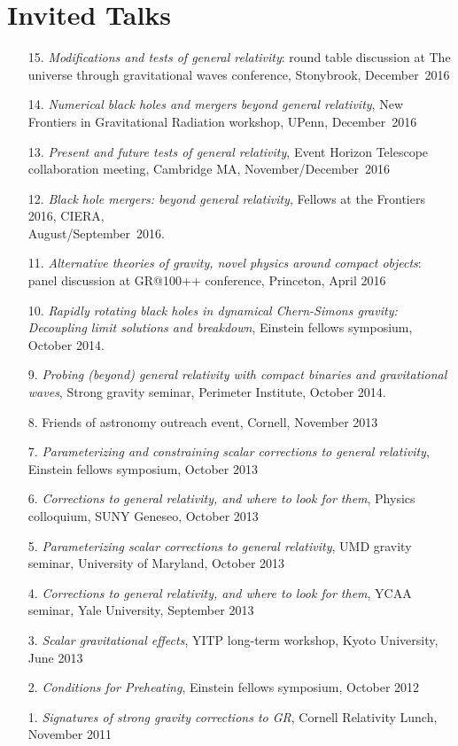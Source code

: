 \newcommand{\playsymbol}{$\blacktriangleright$}
\section{\sc Invited Talks}
\begin{enumerate}
\item[{15.}] {\it Modifications and tests of general relativity}:
  round table discussion at
  The universe through gravitational waves conference,
  Stonybrook, December~2016
\item[{14.}] {\it Numerical black holes and mergers beyond general relativity},
  New Frontiers in Gravitational Radiation workshop, UPenn, December~2016
\item[{13.}] {\it Present and future tests of general relativity},
  Event Horizon Telescope collaboration meeting, Cambridge MA,
  November/December~2016
\item[{12.}] {\it Black hole mergers: beyond general relativity},
  Fellows at the Frontiers 2016, CIERA,\\ August/September~2016.
\item[{11.}] {\it Alternative theories of gravity, novel physics
    around compact objects}: panel discussion at GR@100++ conference,
  Princeton, April 2016
\item[{10.}] {\it Rapidly rotating black holes in dynamical Chern-Simons gravity:
    Decoupling limit solutions and breakdown},
 Einstein fellows symposium, October 2014.
\item[{9.}] {\it Probing (beyond) general relativity with compact binaries and
    gravitational waves},
  Strong gravity seminar, Perimeter Institute, October 2014.
\item[{8.}]
  Friends of astronomy outreach event, Cornell, November 2013
\item[{7.}] {\it Parameterizing and constraining scalar corrections to general relativity},
  Einstein fellows symposium, October 2013
\item[{6.}] {\it Corrections to general relativity, and where to look for them},
  Physics colloquium, SUNY Geneseo, October 2013
\item[{5.}] {\it Parameterizing scalar corrections to general relativity}, UMD gravity seminar,
 University of Maryland, October 2013
\item[{4.}] {\it Corrections to general relativity, and where to look for them},
  YCAA seminar, Yale University, September 2013
\item[{3.}] {\it Scalar gravitational effects}, YITP long-term
  workshop, Kyoto University, June 2013
\item[{2.}] {\it Conditions for Preheating},
  Einstein fellows symposium, October 2012
\item[{1.}] {\it Signatures of strong gravity corrections to GR},
  Cornell Relativity Lunch, November 2011
\end{enumerate}

